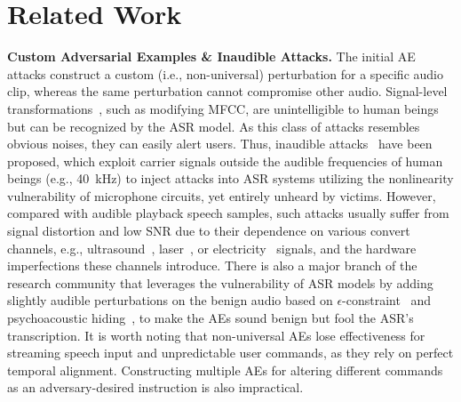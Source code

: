 
\section{Related Work}
\textbf{Custom Adversarial Examples \& Inaudible Attacks.}
The initial AE attacks construct a custom (i.e., non-universal) perturbation for a specific audio clip, whereas the same perturbation cannot compromise other audio. Signal-level transformations~\cite{vaidya2015cocaine,carlini2016hidden,abdullah2019ndss}, such as modifying MFCC, are unintelligible to human beings but can be recognized by the ASR model. As this class of attacks resembles obvious noises, they can easily alert users. Thus, inaudible attacks~\cite{zhang2017dolphinattack,roy2018inaudible,yan2020surfingattack} have been proposed, which exploit carrier signals outside the audible frequencies of human beings (e.g., 40~kHz) to inject attacks into ASR systems utilizing the nonlinearity vulnerability of microphone circuits, yet entirely unheard by victims. However, compared with audible playback speech samples, such attacks usually suffer from signal distortion and low SNR due to their dependence on various convert channels, e.g., ultrasound~\cite{ji2022capspeaker}, laser~\cite{sugawara2020light}, or electricity~\cite{wang2022ghosttalk} signals, and the hardware imperfections these channels introduce.
There is also a major branch of the research community that leverages the vulnerability of ASR models by adding slightly audible perturbations on the benign audio based on $\epsilon$-constraint~\cite{carlini2018audio,taori2019targeted} and psychoacoustic hiding~\cite{schonherr2018adversarial,qin2019imperceptible}, to make the AEs sound benign but fool the ASR's transcription. It is worth noting that non-universal AEs lose effectiveness for streaming speech input and unpredictable user commands, as they rely on perfect temporal alignment. Constructing multiple AEs for altering different commands as an adversary-desired instruction is also impractical. 


